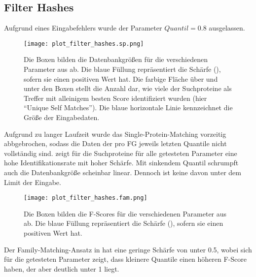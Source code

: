     \subsection{Filter Hashes} %
        \label{sub:filter_results}
        Aufgrund eines Eingabefehlers wurde der Parameter $Quantil=0.8$ ausgelassen.

        \begin{figure}[H]
            \centering
            \texttt{[image: plot\_filter\_hashes.sp.png]}
            \caption[Single-Protein-Matching ]{Die Boxen bilden die Datenbankgrößen für die verschiedenen Parameter aus  ab. Die blaue Füllung repräsentiert die Schärfe (), sofern sie einen positiven Wert hat. Die farbige Fläche über und unter den Boxen stellt die Anzahl dar, wie viele der Suchproteine als Treffer mit alleinigem besten Score identifiziert wurden (hier ``Unique Self Matches''). Die blaue horizontale Linie kennzeichnet die Größe der Eingabedaten.}
            \label{fig:filter_hashes.sp}
        \end{figure}

        Aufgrund zu langer Laufzeit wurde das Single-Protein-Matching vorzeitig abbgebrochen, sodass die Daten der pro \ac{FG} jeweils letzten Quantile nicht vollständig sind.  zeigt für die Suchproteine für alle getesteten Parameter eine hohe Identifikationsrate mit hoher Schärfe. Mit sinkendem Quantil schrumpft auch die Datenbankgröße scheinbar linear. Dennoch ist keine davon unter dem Limit der Eingabe.

        \begin{figure}[H]
            \centering
            \texttt{[image: plot\_filter\_hashes.fam.png]}
            \caption[Family-Matching ]{Die Boxen bilden die F-Scores für die verschiedenen Parameter aus  ab. Die blaue Füllung repräsentiert die Schärfe (), sofern sie einen positiven Wert hat.}
            \label{fig:filter_hashes.fam}
        \end{figure}

        Der Family-Matching-Ansatz in  hat eine geringe Schärfe von unter 0.5, wobei sich für die getesteten Parameter zeigt, dass kleinere Quantile einen höheren F-Score haben, der aber deutlich unter 1 liegt.

